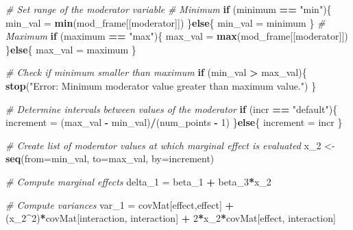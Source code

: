 \documentclass[]{article}
\newenvironment{Shaded}{\begin{snugshade}}{\end{snugshade}}
\newcommand{\KeywordTok}[1]{\textcolor[rgb]{0.13,0.29,0.53}{\textbf{#1}}}
\newcommand{\DataTypeTok}[1]{\textcolor[rgb]{0.13,0.29,0.53}{#1}}
\newcommand{\DecValTok}[1]{\textcolor[rgb]{0.00,0.00,0.81}{#1}}
\newcommand{\StringTok}[1]{\textcolor[rgb]{0.31,0.60,0.02}{#1}}
\newcommand{\CommentTok}[1]{\textcolor[rgb]{0.56,0.35,0.01}{\textit{#1}}}
\newcommand{\ControlFlowTok}[1]{\textcolor[rgb]{0.13,0.29,0.53}{\textbf{#1}}}
\newcommand{\OperatorTok}[1]{\textcolor[rgb]{0.81,0.36,0.00}{\textbf{#1}}}
\newcommand{\NormalTok}[1]{#1}
\begin{document}
\begin{Shaded}
\begin{Highlighting}[]
  \CommentTok{# Set range of the moderator variable}
  \CommentTok{# Minimum}
  \ControlFlowTok{if}\NormalTok{ (minimum }\OperatorTok{==}\StringTok{ "min"}\NormalTok{)\{}
\NormalTok{    min_val =}\StringTok{ }\KeywordTok{min}\NormalTok{(mod_frame[[moderator]])}
\NormalTok{  \}}\ControlFlowTok{else}\NormalTok{\{}
\NormalTok{    min_val =}\StringTok{ }\NormalTok{minimum}
\NormalTok{  \}}
  \CommentTok{# Maximum}
  \ControlFlowTok{if}\NormalTok{ (maximum }\OperatorTok{==}\StringTok{ "max"}\NormalTok{)\{}
\NormalTok{    max_val =}\StringTok{ }\KeywordTok{max}\NormalTok{(mod_frame[[moderator]])}
\NormalTok{  \}}\ControlFlowTok{else}\NormalTok{\{}
\NormalTok{    max_val =}\StringTok{ }\NormalTok{maximum}
\NormalTok{  \}}
  
  \CommentTok{# Check if minimum smaller than maximum}
  \ControlFlowTok{if}\NormalTok{ (min_val }\OperatorTok{>}\StringTok{ }\NormalTok{max_val)\{}
    \KeywordTok{stop}\NormalTok{(}\StringTok{"Error: Minimum moderator value greater than maximum value."}\NormalTok{)}
\NormalTok{  \}}
  
  \CommentTok{# Determine intervals between values of the moderator}
  \ControlFlowTok{if}\NormalTok{ (incr }\OperatorTok{==}\StringTok{ "default"}\NormalTok{)\{}
\NormalTok{    increment =}\StringTok{ }\NormalTok{(max_val }\OperatorTok{-}\StringTok{ }\NormalTok{min_val)}\OperatorTok{/}\NormalTok{(num_points }\OperatorTok{-}\StringTok{ }\DecValTok{1}\NormalTok{)}
\NormalTok{  \}}\ControlFlowTok{else}\NormalTok{\{}
\NormalTok{    increment =}\StringTok{ }\NormalTok{incr}
\NormalTok{  \}}
  
  \CommentTok{# Create list of moderator values at which marginal effect is evaluated}
\NormalTok{  x_}\DecValTok{2}\NormalTok{ <-}\StringTok{ }\KeywordTok{seq}\NormalTok{(}\DataTypeTok{from=}\NormalTok{min_val, }\DataTypeTok{to=}\NormalTok{max_val, }\DataTypeTok{by=}\NormalTok{increment)}
  
  \CommentTok{# Compute marginal effects}
\NormalTok{  delta_}\DecValTok{1}\NormalTok{ =}\StringTok{ }\NormalTok{beta_}\DecValTok{1} \OperatorTok{+}\StringTok{ }\NormalTok{beta_}\DecValTok{3}\OperatorTok{*}\NormalTok{x_}\DecValTok{2}
  
  \CommentTok{# Compute variances}
\NormalTok{  var_}\DecValTok{1}\NormalTok{ =}\StringTok{ }\NormalTok{covMat[effect,effect] }\OperatorTok{+}\StringTok{ }\NormalTok{(x_}\DecValTok{2}\OperatorTok{^}\DecValTok{2}\NormalTok{)}\OperatorTok{*}\NormalTok{covMat[interaction, interaction] }\OperatorTok{+}\StringTok{ }\DecValTok{2}\OperatorTok{*}\NormalTok{x_}\DecValTok{2}\OperatorTok{*}\NormalTok{covMat[effect, interaction]}
  

\end{Highlighting}
\end{Shaded}
\end{document}
